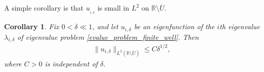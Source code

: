 \documentclass[preprint,12pt]{elsarticle}
\newcommand{\R}{\mathbb R}
\newtheorem{lemma}[theorem]{Lemma}
\newtheorem{corollary}[theorem]{Corollary}
\begin{document}
\noindent A simple corollary is that $u_{_{i,\delta}}$ is small in $L^2$ on $\R\setminus\overline{U}$.
\begin{corollary}\label{small_L2_bound_w_Ucomp}
Fix $0<\delta\ll 1$, and let $u_{i,\delta}$ be an eigenfunction of the
$i$th eigenvalue $\lambda_{i,\delta}$ of eigenvalue problem
\eqref{evalue_problem_finite_well}. Then
\begin{align}
    \|u_{i,\delta}\|_{L^2(\R\setminus\overline{U})}
    \leq C\delta^{1/2},
\end{align}
where $C>0$ is independent of $\delta$.
\end{corollary}
\end{document}

